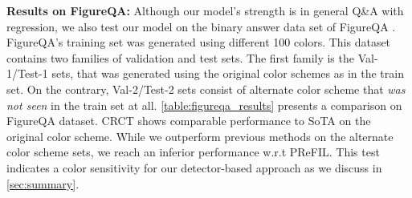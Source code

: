 \documentclass[runningheads]{llncs}
\newcommand\our[1][]{CRCT\xspace}
\begin{document}
{\bf Results on FigureQA: } Although our model's strength is in general Q\&A with regression, we also test our model on the binary answer data set of FigureQA \cite{figureqa}. FigureQA's training set was generated using different 100 colors. This dataset contains two families of validation and test sets. The first family is the Val-1/Test-1 sets, that was generated using the original color schemes as in the train set. On the contrary, Val-2/Test-2 sets consist of alternate color scheme that {\it was not seen} in the train set at all.
\cref{table:figureqa_results} presents a comparison on FigureQA dataset. \our shows comparable performance to SoTA on the original color scheme. While we outperform previous methods on the alternate color scheme sets, we reach an inferior performance w.r.t PReFIL. This test indicates a color sensitivity for our detector-based approach as we discuss in \cref{sec:summary}.
\end{document}
